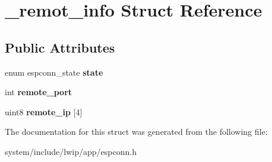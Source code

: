 \hypertarget{struct__remot__info}{}\section{\+\_\+remot\+\_\+info Struct Reference}
\label{struct__remot__info}
\subsection*{Public Attributes}
\begin{DoxyCompactItemize}
\item 
\hypertarget{struct__remot__info_ab98ccfecb16aeb3e62737837b7f66225}{}enum espconn\+\_\+state {\bfseries state}\label{struct__remot__info_ab98ccfecb16aeb3e62737837b7f66225}

\item 
\hypertarget{struct__remot__info_a4be9e038cc9f63448e8b73c72f09bf7c}{}int {\bfseries remote\+\_\+port}\label{struct__remot__info_a4be9e038cc9f63448e8b73c72f09bf7c}

\item 
\hypertarget{struct__remot__info_aaa112e2be9ee815e2305e7d4f7ae958e}{}uint8 {\bfseries remote\+\_\+ip} \mbox{[}4\mbox{]}\label{struct__remot__info_aaa112e2be9ee815e2305e7d4f7ae958e}

\end{DoxyCompactItemize}


The documentation for this struct was generated from the following file\+:\begin{DoxyCompactItemize}
\item 
system/include/lwip/app/espconn.\+h\end{DoxyCompactItemize}
